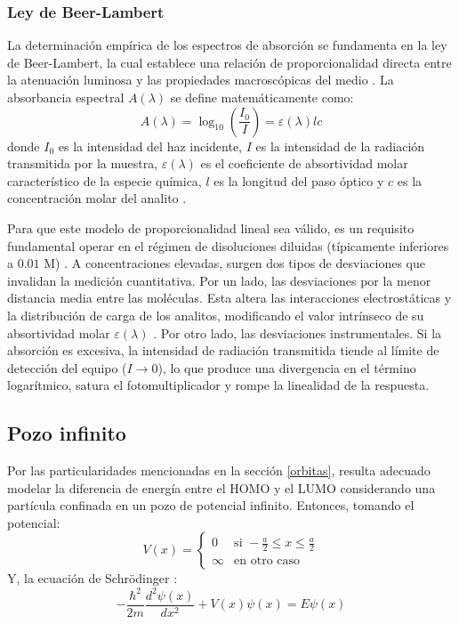 \documentclass[12pt,a4paper,twocolumn]{informeUNLP} %
\begin{document}
\subsubsection{Ley de Beer-Lambert}
La determinación empírica de los espectros de absorción se fundamenta en la ley de Beer-Lambert, la cual establece una relación de proporcionalidad directa entre la atenuación luminosa y las propiedades macroscópicas del medio \cite{skoog2017}. La absorbancia espectral $A(\lambda)$ se define matemáticamente como:
$$A(\lambda) = \log_{10}\left(\frac{I_0}{I}\right) = \varepsilon(\lambda) l c$$
donde $I_0$ es la intensidad del haz incidente, $I$ es la intensidad de la radiación transmitida por la muestra, $\varepsilon(\lambda)$ es el coeficiente de absortividad molar característico de la especie química, $l$ es la longitud del paso óptico y $c$ es la concentración molar del analito \cite{skoog2017}.

Para que este modelo de proporcionalidad lineal sea válido, es un requisito fundamental operar en el régimen de disoluciones diluidas (típicamente inferiores a $0.01\text{ M}$) \cite{skoog2017}. A concentraciones elevadas, surgen dos tipos de desviaciones que invalidan la medición cuantitativa. Por un lado, las desviaciones por la menor distancia media entre las moléculas. Esta altera las interacciones electrostáticas y la distribución de carga de los analitos, modificando el valor intrínseco de su absortividad molar $\varepsilon(\lambda)$ \cite{skoog2017}. Por otro lado, las desviaciones instrumentales. Si la absorción es excesiva, la intensidad de radiación transmitida tiende al límite de detección del equipo ($I \to 0$), lo que produce una divergencia en el término logarítmico, satura el fotomultiplicador y rompe la linealidad de la respuesta.

\subsection{Pozo infinito}\label{intro:pozo_inf}
Por las particularidades mencionadas en la sección \ref{orbitas}, resulta adecuado modelar la diferencia de energía entre el HOMO y el LUMO considerando una partícula confinada en un pozo de potencial infinito. Entonces, tomando el potencial:
$$V(x) = \begin{cases}
0 & \text{si } -\frac{a}{2} \le x \le \frac{a}{2} \\[6pt]
\infty & \text{en otro caso}
\end{cases}$$
Y, la ecuación de Schrödinger \cite{griffiths2005}:
$$-\frac{\hbar^2}{2m} \frac{d^2 \psi(x)}{dx^2} + V(x)\psi(x) = E\psi(x)$$
\end{document}
